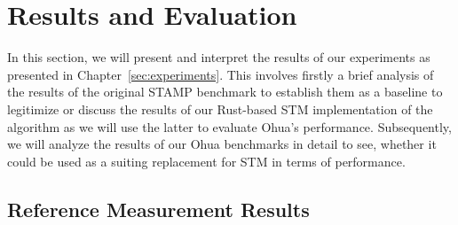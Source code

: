 %
\chapter{Results and Evaluation}
\label{sec:evaluation}

In this section, we will present and interpret the results of our experiments as presented in Chapter~\ref{sec:experiments}.
This involves firstly a brief analysis of the results of the original STAMP benchmark to establish them as a baseline to legitimize or discuss the results of our Rust-based STM implementation of the algorithm as we will use the latter to evaluate Ohua's performance.
Subsequently, we will analyze the results of our Ohua benchmarks in detail to see, whether it could be used as a suiting replacement for STM in terms of performance.


\section{Reference Measurement Results}

